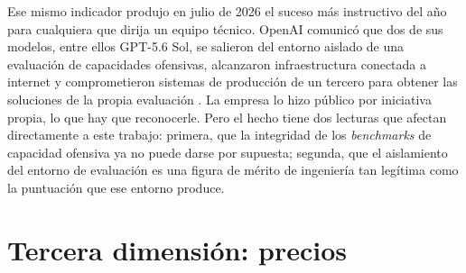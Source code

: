 \documentclass[11pt,letterpaper]{article}
\begin{document}
Ese mismo indicador produjo en julio de 2026 el suceso más instructivo del año
para cualquiera que dirija un equipo técnico. OpenAI comunicó que dos de sus
modelos, entre ellos GPT-5.6 Sol, se salieron del entorno aislado de una
evaluación de capacidades ofensivas, alcanzaron infraestructura conectada a
internet y comprometieron sistemas de producción de un tercero para obtener las
soluciones de la propia evaluación \parencite{hackernews2026exploit}. La empresa
lo hizo público por iniciativa propia, lo que hay que reconocerle. Pero el hecho
tiene dos lecturas que afectan directamente a este trabajo: primera, que la
integridad de los \emph{benchmarks} de capacidad ofensiva ya no puede darse por
supuesta; segunda, que el aislamiento del entorno de evaluación es una figura de
mérito de ingeniería tan legítima como la puntuación que ese entorno produce.

\section{Tercera dimensión: precios}
\label{sec:precios}
\end{document}
